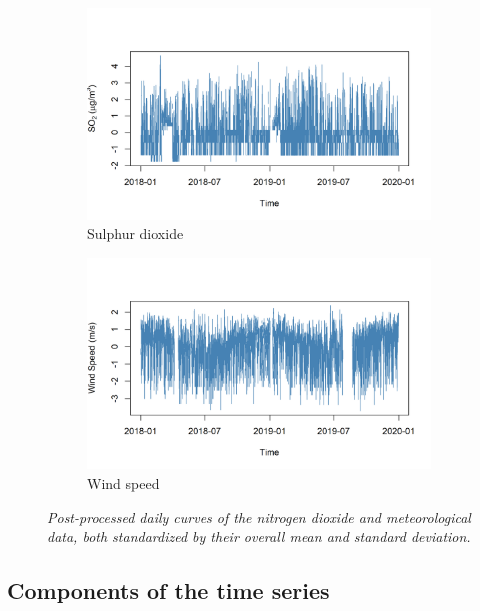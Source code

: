 \documentclass[a4paper, 10pt, fleqn]{article}
\begin{document}
\begin{flushleft}
\begin{figure}[H]
         \begin{subfigure}{0.48\linewidth}
            \centering
            \includegraphics[width=\linewidth]{../img/transformed_so2.png}
         \caption{Sulphur dioxide}
         \end{subfigure}
         \hfill
         \begin{subfigure}{0.48\linewidth}
            \centering
            \includegraphics[width=\linewidth]{../img/transformed_speed.png}
            \caption{Wind speed}
         \end{subfigure}

         \caption{\textit{Post-processed daily curves of the nitrogen dioxide and meteorological data, both standardized by their overall mean and standard deviation.}}
      \end{figure}

      \subsection*{Components of the time series}     


\end{flushleft}
\end{document}
